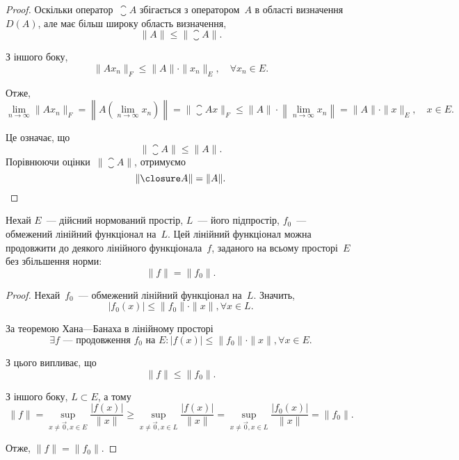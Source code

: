 \begin{proof}
Оскільки оператор~$\closure A$ збігається з оператором~$A$ в області
визначення~$D(A)$, але має більш широку область визначення,
\begin{equation*}
    \|A\| \le \|\closure A\|.
\end{equation*}

З іншого боку,
\begin{equation*}
    \|Ax_n\|_F \le \|A\| \cdot \|x_n\|_E, \quad \forall x_n \in E.
\end{equation*}

Отже,
\begin{equation*}
    \lim_{n \to \infty} \|Ax_n\|_F =
    \left\| A \left( \lim_{n \to \infty} x_n \right) \right\| =
    \| \closure A x \|_F \le 
    \|A\| \cdot \left\| \lim_{n \to \infty} x_n \right\| = 
    \|A\| \cdot \|x\|_E, \quad x \in E.
\end{equation*}

Це означає, що
\begin{equation*}
    \|\closure A\| \le \|A\|.
\end{equation*}
Порівнюючи оцінки~$\|\closure A\|$, отримуємо
\begin{equation*}
    \|\closure A\| = \|A\|. \qedhere
\end{equation*}
\end{proof}

\begin{theorem} Нехай
$E$~--- дійсний нормований простір, $L$~--- його підпростір,
$f_0$~--- обмежений лінійний функціонал на~$L$. Цей лінійний
функціонал можна продовжити до деякого лінійного
функціонала~$f$, заданого на всьому просторі~$E$ без
збільшення норми:
\begin{equation*}
    \|f\| = \|f_0\|.
\end{equation*}
\end{theorem}

\begin{proof}
Нехай~$f_0$~--- обмежений лінійний функціонал на~$L$. Значить,
\begin{equation*}
    |f_0(x)| \le \|f_0\| \cdot \|x\|, \forall x \in L.
\end{equation*}

За теоремою Хана---Банаха в лінійному просторі
\begin{equation*}
    \exists f \text{~--- продовження } f_0 \text{ на } E:
    |f(x)| \le \|f_0\| \cdot \|x\|, \forall x \in E.
\end{equation*}

З цього випливає, що
\begin{equation*}
    \|f\| \le \|f_0\|.
\end{equation*}

З іншого боку, $L \subset E$, а тому
\begin{equation*}
    \|f\| = \sup_{x \ne \vec 0, x \in E} \frac{|f(x)|}{\|x\|} \ge
    \sup_{x \ne \vec 0, x \in L} \frac{|f(x)|}{\|x\|} =
    \sup_{x \ne \vec 0, x \in L} \frac{|f_0(x)|}{\|x\|} = \|f_0\|.
\end{equation*}

Отже, $\|f\| = \|f_0\|$.
\end{proof}

